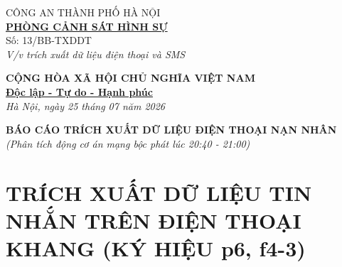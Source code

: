 \documentclass[12pt,a4paper]{article}
\begin{document}
\noindent
\begin{minipage}[t]{0.45\textwidth}
    \begin{center}
        \small
        CÔNG AN THÀNH PHỐ HÀ NỘI\\
        \textbf{\underline{PHÒNG CẢNH SÁT HÌNH SỰ}}\\[0.1cm]
        Số: 13/BB-TXDDT\\
        \textit{V/v trích xuất dữ liệu điện thoại và SMS}
    \end{center}
\end{minipage}
\hfill
\begin{minipage}[t]{0.52\textwidth}
    \begin{center}
        \small
        \textbf{CỘNG HÒA XÃ HỘI CHỦ NGHĨA VIỆT NAM}\\
        \textbf{\underline{Độc lập - Tự do - Hạnh phúc}}\\[0.1cm]
        \textit{Hà Nội, ngày 25 tháng 07 năm 2026}
    \end{center}
\end{minipage}

\vspace{0.6cm}

\begin{center}
    \textbf{\large BÁO CÁO TRÍCH XUẤT DỮ LIỆU ĐIỆN THOẠI NẠN NHÂN}\\
    \textit{(Phân tích động cơ án mạng bộc phát lúc 20:40 - 21:00)}
\end{center}

\vspace{0.3cm}

\section*{TRÍCH XUẤT DỮ LIỆU TIN NHẮN TRÊN ĐIỆN THOẠI KHANG (KÝ HIỆU p6, f4-3)}
\end{document}
